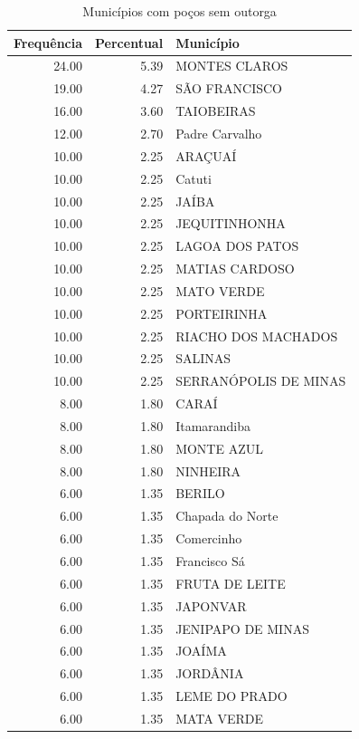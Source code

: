 \documentclass[a4paper, 12pt, openright, oneside, english, brazil, article]{abntex2}
\begin{document}
	
	\begin{scriptsize}
		\begin{longtable}{rrl}
			\caption{Municípios com poços sem outorga} \\ 
			\hline
			Frequência & Percentual & Município \\ 
			\hline
			24.00 & 5.39 & MONTES CLAROS \\ 
			19.00 & 4.27 & SÃO FRANCISCO \\ 
			16.00 & 3.60 & TAIOBEIRAS \\ 
			12.00 & 2.70 & Padre Carvalho \\ 
			10.00 & 2.25 & ARAÇUAÍ \\ 
			10.00 & 2.25 & Catuti \\ 
			10.00 & 2.25 & JAÍBA \\ 
			10.00 & 2.25 & JEQUITINHONHA \\ 
			10.00 & 2.25 & LAGOA DOS PATOS \\ 
			10.00 & 2.25 & MATIAS CARDOSO \\ 
			10.00 & 2.25 & MATO VERDE \\ 
			10.00 & 2.25 & PORTEIRINHA \\ 
			10.00 & 2.25 & RIACHO DOS MACHADOS \\ 
			10.00 & 2.25 & SALINAS \\ 
			10.00 & 2.25 & SERRANÓPOLIS DE MINAS \\ 
			8.00 & 1.80 & CARAÍ \\ 
			8.00 & 1.80 & Itamarandiba \\ 
			8.00 & 1.80 & MONTE AZUL \\ 
			8.00 & 1.80 & NINHEIRA \\ 
			6.00 & 1.35 & BERILO \\ 
			6.00 & 1.35 & Chapada do Norte \\ 
			6.00 & 1.35 & Comercinho \\ 
			6.00 & 1.35 & Francisco Sá \\ 
			6.00 & 1.35 & FRUTA DE LEITE \\ 
			6.00 & 1.35 & JAPONVAR \\ 
			6.00 & 1.35 & JENIPAPO DE MINAS \\ 
			6.00 & 1.35 & JOAÍMA \\ 
			6.00 & 1.35 & JORDÂNIA \\ 
			6.00 & 1.35 & LEME DO PRADO \\ 
			6.00 & 1.35 & MATA VERDE \\ 

\end{longtable}
\end{scriptsize}
\end{document}
